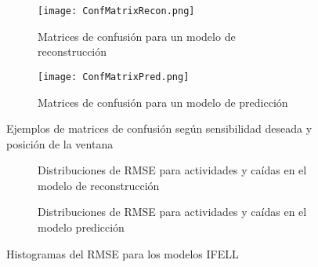 \begin{sidewaysfigure}[!ht]
  \centering
  \begin{subfigure}[b]{0.45\textwidth}
      \centering
      \texttt{[image: ConfMatrixRecon.png]}
      \caption{\footnotesize \label{fig:ifell:adata:confmat:recon}Matrices de confusión para un modelo de reconstrucción}
  \end{subfigure}
  \hfill
  \begin{subfigure}[b]{0.45\textwidth}
      \centering
      \texttt{[image: ConfMatrixPred.png]}
      \caption{\footnotesize \label{fig:ifell:adata:confmat:pred}Matrices de confusión para un modelo de predicción}
  \end{subfigure}
  \caption{\label{fig:ifell:adata:confmats}Ejemplos de matrices de confusión según sensibilidad deseada y posición de la ventana}
\end{sidewaysfigure}


\begin{figure}[!ht]
  \centering
  \begin{subfigure}[b]{0.45\textwidth}
      \centering
      \caption{\footnotesize \label{fig:ifell:adata:rmshist:recon}Distribuciones de RMSE para actividades y caídas en el modelo de reconstrucción}
  \end{subfigure}
  \hfill
  \begin{subfigure}[b]{0.45\textwidth}
      \centering
      \caption{\footnotesize \label{fig:ifell:adata:rmshist:pred}Distribuciones de RMSE para actividades y caídas en el modelo predicción}
  \end{subfigure}
  \caption{\label{fig:ifell:adata:rmshist}Histogramas del RMSE para los modelos IFELL}
\end{figure}

